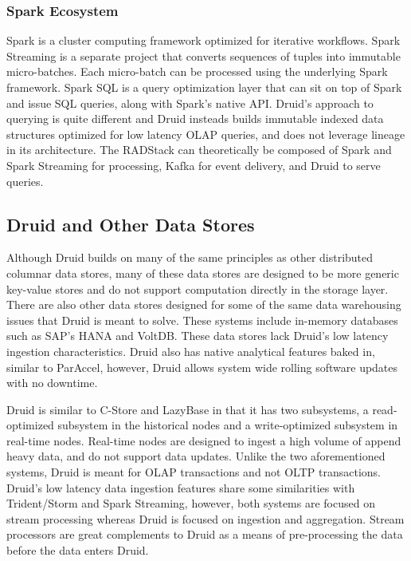 \documentclass{vldb}
\begin{document}
\subsubsection{Spark Ecosystem}
Spark\cite{zaharia2012resilient} is a cluster computing framework optimized for
iterative workflows.  Spark Streaming is a separate project that converts
sequences of tuples into immutable micro-batches. Each micro-batch can be
processed using the underlying Spark framework. Spark SQL is a query
optimization layer that can sit on top of Spark and issue SQL queries, along
with Spark’s native API.  Druid’s approach to querying is quite
different and Druid insteads builds immutable indexed data structures optimized
for low latency OLAP queries, and does not leverage lineage in its architecture.
The RADStack can theoretically be composed of Spark and Spark Streaming for
processing, Kafka for event delivery, and Druid to serve queries.

\subsection{Druid and Other Data Stores}
Although Druid builds on many of the same principles as other distributed
columnar data stores\cite{fink2012distributed}, many of these data stores are
designed to be more generic key-value stores\cite{lakshman2010cassandra} and do
not support computation directly in the storage layer. There are also other
data stores designed for some of the same data warehousing issues that Druid is
meant to solve. These systems include in-memory databases such as SAP’s
HANA\cite{farber2012sap} and VoltDB\cite{voltdb2010voltdb}. These data stores
lack Druid’s low latency ingestion characteristics. Druid also has native
analytical features baked in, similar to ParAccel\cite{paraccel2013}, however,
Druid allows system wide rolling software updates with no downtime. 

Druid is similar to C-Store\cite{stonebraker2005c} and
LazyBase\cite{cipar2012lazybase} in that it has two subsystems, a
read-optimized subsystem in the historical nodes and a write-optimized
subsystem in real-time nodes. Real-time nodes are designed to ingest a high
volume of append heavy data, and do not support data updates. Unlike the two
aforementioned systems, Druid is meant for OLAP transactions and not OLTP
transactions. Druid’s low latency data ingestion features share some
similarities with Trident/Storm\cite{marz2013storm} and Spark
Streaming\cite{zaharia2012discretized}, however, both systems are focused on
stream processing whereas Druid is focused on ingestion and aggregation. Stream
processors are great complements to Druid as a means of pre-processing the data
before the data enters Druid. 
\end{document}
